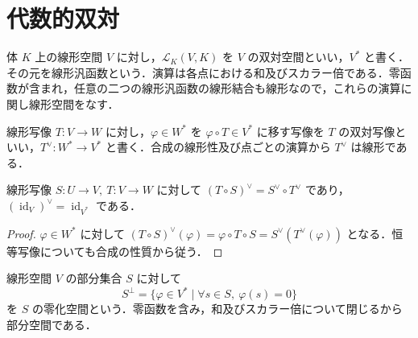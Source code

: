 \section{代数的双対}
\begin{defn}[双対空間]
体 $K$ 上の線形空間 $V$ に対し，$\mathcal L_K(V,K)$ を $V$ の双対空間といい，$V^*$ と書く．その元を線形汎函数という．演算は各点における和及びスカラー倍である．零函数が含まれ，任意の二つの線形汎函数の線形結合も線形なので，これらの演算に関し線形空間をなす．
\end{defn}
\begin{defn}[双対写像]
線形写像 $T:V\to W$ に対し，$\varphi\in W^*$ を $\varphi\circ T\in V^*$ に移す写像を $T$ の双対写像といい，$T^\vee:W^*\to V^*$ と書く．合成の線形性及び点ごとの演算から $T^\vee$ は線形である．
\end{defn}
\begin{prop}[双対写像と合成]
線形写像 $S:U\to V,\ T:V\to W$ に対して $(T\circ S)^\vee=S^\vee\circ T^\vee$ であり，$(\operatorname{id}_V)^\vee=\operatorname{id}_{V^*}$ である．
\end{prop}
\begin{proof}
$\varphi\in W^*$ に対して $(T\circ S)^\vee(\varphi)=\varphi\circ T\circ S=S^\vee(T^\vee(\varphi))$ となる．恒等写像についても合成の性質から従う．
\end{proof}
\begin{defn}[零化空間]
線形空間 $V$ の部分集合 $S$ に対して
\[
 S^\perp=\{\varphi\in V^*\mid \forall s\in S,\ \varphi(s)=0\}
\]
を $S$ の零化空間という．零函数を含み，和及びスカラー倍について閉じるから部分空間である．
\end{defn}
